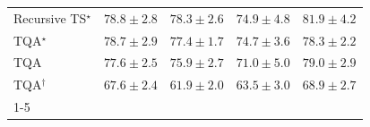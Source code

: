 \begin{tabular}{l|cccc|}
Recursive TS$^\star$ & {\cellcolor[HTML]{045C90}} \color[HTML]{F1F1F1} $78.8\pm 2.8$ & {\cellcolor[HTML]{046097}} \color[HTML]{F1F1F1} $78.3\pm 2.6$ & {\cellcolor[HTML]{1C7FB8}} \color[HTML]{F1F1F1} $74.9\pm 4.8$ & {\cellcolor[HTML]{02395A}} \color[HTML]{F1F1F1} $81.9\pm 4.2$ \\
TQA$^\star$ & {\cellcolor[HTML]{045D92}} \color[HTML]{F1F1F1} $78.7\pm 2.9$ & {\cellcolor[HTML]{0567A2}} \color[HTML]{F1F1F1} $77.4\pm 1.7$ & {\cellcolor[HTML]{2081B9}} \color[HTML]{F1F1F1} $74.7\pm 3.6$ & {\cellcolor[HTML]{046097}} \color[HTML]{F1F1F1} $78.3\pm 2.2$ \\
TQA & {\cellcolor[HTML]{05659F}} \color[HTML]{F1F1F1} $77.6\pm 2.5$ & {\cellcolor[HTML]{0A73B2}} \color[HTML]{F1F1F1} $75.9\pm 2.7$ & {\cellcolor[HTML]{69A5CC}} \color[HTML]{F1F1F1} $71.0\pm 5.0$ & {\cellcolor[HTML]{045B8E}} \color[HTML]{F1F1F1} $79.0\pm 2.9$ \\
TQA$^\dagger$ & {\cellcolor[HTML]{A7BDDB}} \color[HTML]{000000} $67.6\pm 2.4$ & {\cellcolor[HTML]{ECE7F2}} \color[HTML]{000000} $61.9\pm 2.0$ & {\cellcolor[HTML]{DCDAEB}} \color[HTML]{000000} $63.5\pm 3.0$ & {\cellcolor[HTML]{8FB4D6}} \color[HTML]{000000} $68.9\pm 2.7$ \\
\cline{1-5}
\bottomrule
\end{tabular}
